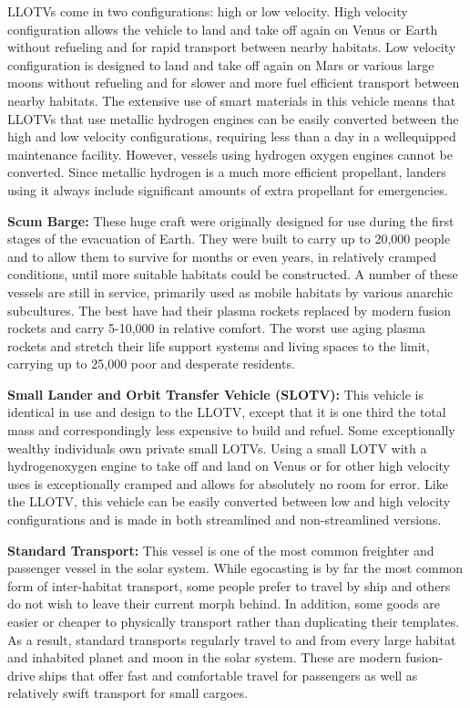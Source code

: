 {{LLOTVs come in two configurations: high or low velocity. High velocity configuration allows the vehicle to land and take off again on Venus or Earth without refueling and for rapid transport between nearby habitats. Low velocity configuration is designed to land and take off again on Mars or various large moons without refueling and for slower and more fuel efficient transport between nearby habitats. The extensive use of smart materials in this vehicle means that LLOTVs that use metallic hydrogen engines can be easily converted between the high and low velocity configurations, requiring less than a day in a wellequipped maintenance facility. However, vessels using hydrogen oxygen engines cannot be converted. Since metallic hydrogen is a much more efficient propellant, landers using it always include significant amounts of extra propellant for emergencies. 

\textbf{Scum Barge:} These huge craft were originally designed for use during the first stages of the evacuation of Earth. They were built to carry up to 20,000 people and to allow them to survive for months or even years, in relatively cramped conditions, until more suitable habitats could be constructed. A number of these vessels are still in service, primarily used as mobile habitats by various anarchic subcultures. The best have had their plasma rockets replaced by modern fusion rockets and carry 5-10,000 in relative comfort. The worst use aging plasma rockets and stretch their life support systems and living spaces to the limit, carrying up to 25,000 poor and desperate residents. 

\textbf{Small Lander and Orbit Transfer Vehicle (SLOTV):} This vehicle is identical in use and design to the LLOTV, except that it is one third the total mass and correspondingly less expensive to build and refuel. Some exceptionally wealthy individuals own private small LOTVs. Using a small LOTV with a hydrogenoxygen engine to take off and land on Venus or for other high velocity uses is exceptionally cramped and allows for absolutely no room for error. Like the LLOTV, this vehicle can be easily converted between low and high velocity configurations and is made in both streamlined and non-streamlined versions. 

\textbf{Standard Transport:} This vessel is one of the most common freighter and passenger vessel in the solar system. While egocasting is by far the most common form of inter-habitat transport, some people prefer to travel by ship and others do not wish to leave their current morph behind. In addition, some goods are easier or cheaper to physically transport rather than duplicating their templates. As a result, standard transports regularly travel to and from every large habitat and inhabited planet and moon in the solar system. These are modern fusion-drive ships that offer fast and comfortable travel for passengers as well as relatively swift transport for small cargoes. 

}}
